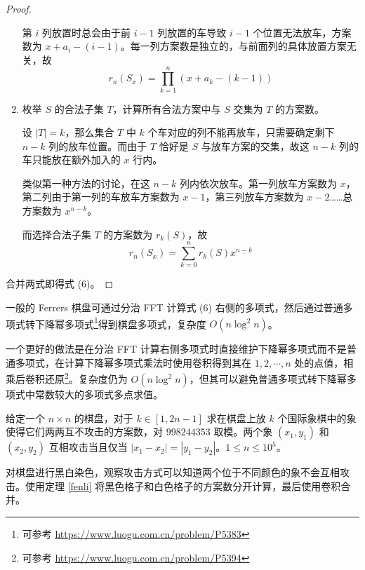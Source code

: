 \documentclass{noithesis}
\begin{document}
\begin{proof}
\begin{enumerate}
			第 $i$ 列放置时总会由于前 $i-1$ 列放置的车导致 $i-1$ 个位置无法放车，方案数为 $x+a_i-(i-1)$。每一列方案数是独立的，与前面列的具体放置方案无关，故 $$r_n(S_x) = \prod_{k=1}^n (x+a_k-(k-1)) $$
			\item 枚举 $S$ 的合法子集 $T$，计算所有合法方案中与 $S$ 交集为 $T$ 的方案数。
			
			设 $|T| = k$，那么集合 $T$ 中 $k$ 个车对应的列不能再放车，只需要确定剩下 $n-k$ 列的放车位置。而由于 $T$ 恰好是 $S$ 与放车方案的交集，故这 $n-k$ 列的车只能放在额外加入的 $x$ 行内。
			
			类似第一种方法的讨论，在这 $n-k$ 列内依次放车。第一列放车方案数为 $x$，第二列由于第一列的车放车方案数为 $x-1$，第三列放车方案数为 $x-2$……总方案数为 $x^{\underline{n-k}}$。
			
			而选择合法子集 $T$ 的方案数为 $r_k(S)$，故 $$r_n(S_x) = \sum_{k=0}^n r_k(S)x^{\underline{n-k}}$$
		\end{enumerate}
		
		合并两式即得式 (6)。
	\end{proof}
	一般的 Ferrers 棋盘可通过分治 FFT 计算式 (6) 右侧的多项式，然后通过普通多项式转下降幂多项式\footnote{可参考 \href{https://www.luogu.com.cn/problem/P5383}{https://www.luogu.com.cn/problem/P5383}}得到棋盘多项式，复杂度 $O(n \log^2 n)$。
	
	一个更好的做法是在分治 FFT 计算右侧多项式时直接维护下降幂多项式而不是普通多项式，在计算下降幂多项式乘法时使用卷积得到其在 $1,2,\cdots,n$ 处的点值，相乘后卷积还原\footnote{可参考 \href{https://www.luogu.com.cn/problem/P5394}{https://www.luogu.com.cn/problem/P5394}}。复杂度仍为 $O(n \log^2 n)$，但其可以避免普通多项式转下降幂多项式中常数较大的多项式多点求值。
	
	\begin{problem}
		给定一个 $n \times n$ 的棋盘，对于 $k \in [1,2n-1]$ 求在棋盘上放 $k$ 个国际象棋中的象使得它们两两互不攻击的方案数，对 $998244353$ 取模。两个象 $(x_1,y_1)$ 和 $(x_2,y_2)$ 互相攻击当且仅当 $|x_1-x_2| = |y_1-y_2|$。$1 \leq n \leq 10^5$。
	\end{problem}
	
	对棋盘进行黑白染色，观察攻击方式可以知道两个位于不同颜色的象不会互相攻击。使用定理 \ref{fenli} 将黑色格子和白色格子的方案数分开计算，最后使用卷积合并。
	
\end{document}
